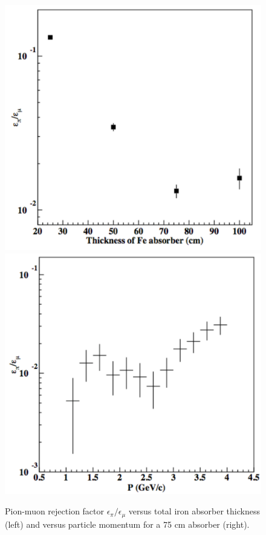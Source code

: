 \begin{figure}[!ht]
\includegraphics[scale=0.44]{muon/pmrej.pdf}
\includegraphics[scale=0.44]{muon/pmrej4.pdf}
\caption{\small{Pion-muon rejection factor $\epsilon_\pi/\epsilon_\mu$ versus total iron absorber thickness
(left) and versus particle momentum for a 75 cm absorber (right).}}\label{fig:pmrej}
\end{figure}


